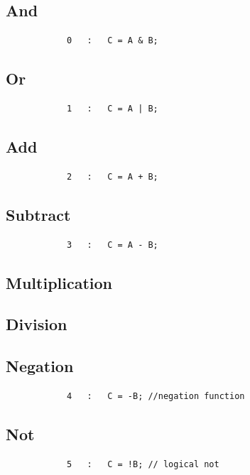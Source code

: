 \documentclass{article}
\begin{document}
    \subsection{And}
        \begin{lstlisting}
            0   :   C = A & B;
        \end{lstlisting}
    \subsection{Or}
        \begin{lstlisting}
			1   :   C = A | B;
        \end{lstlisting}
    \subsection{Add}
        \begin{lstlisting}
            2   :   C = A + B;
        \end{lstlisting}
    \subsection{Subtract}
        \begin{lstlisting}
			3   :   C = A - B;
        \end{lstlisting}
    \subsection{Multiplication}
        
    \subsection{Division}
        \label{DIV_ALG}
    \subsection{Negation}
        \begin{lstlisting}
            4   :   C = -B; //negation function
        \end{lstlisting}
    \subsection{Not}
        \begin{lstlisting}
            5   :   C = !B; // logical not 
        \end{lstlisting}
\end{document}
